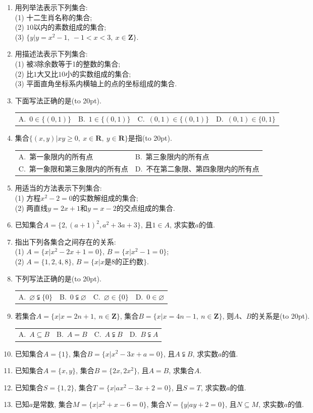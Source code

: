 \documentclass[10pt,a4paper]{article}
\newcommand{\bracket}[1]{(\hbox to #1pt{})}
\newcommand{\twoch}[4]{\par\begin{tabular}{p{.46\textwidth}p{.46\textwidth}}
A.~#1& B.~#2\\
C.~#3& D.~#4
\end{tabular}}
\newcommand{\fourch}[4]{\par\begin{tabular}{p{.23\textwidth}p{.23\textwidth}p{.23\textwidth}p{.23\textwidth}}
A.~#1 &B.~#2& C.~#3& D.~#4
\end{tabular}}
\begin{document}
\begin{enumerate}[1.]

\item 用列举法表示下列集合:\\
(1) 十二生肖名称的集合;\\
(2) $10$以内的素数组成的集合;\\
(3) $\{y|y=x^2-1, \ -1<x<3, \ x\in \mathbf{Z}\}$.
\item 用描述法表示下列集合:\\
(1) 被$3$除余数等于1的整数的集合;\\
(2) 比$1$大又比$10$小的实数组成的集合;\\
(3) 平面直角坐标系内横轴上的点的坐标组成的集合.
\item 下面写法正确的是\bracket{20}.
\fourch{$0\in \{(0,1)\}$}{$1\in \{(0,1)\}$}{$(0,1)\in \{(0,1)\}$}{$(0,1)\in \{0,1\}$}
\item 集合$\{(x,y)|xy\ge 0, \ x\in \mathbf{R}, \ y\in \mathbf{R}\}$是指\bracket{20}.
\twoch{第一象限内的所有点}{第三象限内的所有点}{第一象限和第三象限内的所有点}{不在第二象限、第四象限内的所有点}
\item 用适当的方法表示下列集合:\\
(1) 方程$x^2-2=0$的实数解组成的集合;\\
(2) 两直线$y=2x+1$和$y=x-2$的交点组成的集合.
\item 已知集合$A=\{2,(a+1)^2,a^2+3a+3\}$, 且$1\in A$, 求实数$a$的值.
\item 指出下列各集合之间存在的关系:\\
(1) $A=\{x|x^2-2x+1=0\}$, $B=\{x|x^2-1=0\}$;\\
(2) $A=\{1,2,4,8\}$, $B=\{x|x\text{是}8\text{的正约数}\}$.
\item 下列写法正确的是\bracket{20}.
\fourch{$\varnothing \subsetneqq \{0\}$}{$0\subsetneqq \varnothing$}{$\varnothing \in \{0\}$}{$0\in \varnothing$}
\item 若集合$A=\{x|x=2n+1, \ n\in \mathbf{Z}\}$, 集合$B=\{x|x=4n-1, \ n\in \mathbf{Z}\}$, 则$A$、$B$的关系是\bracket{20}.
\fourch{$A\subseteq B$}{$A=B$}{$A\subsetneqq B$}{$B\subsetneqq A$}
\item 已知集合$A=\{1\}$, 集合$B=\{x|x^2-3x+a=0\}$, 且$A\subsetneqq B$, 求实数$a$的值.
\item 已知集合$A=\{x,y\}$, 集合$B=\{2x,2x^2\}$, 且$A=B$, 求集合$A$.
\item 已知集合$S=\{1,2\}$, 集合$T=\{x|ax^2-3x+2=0\}$, 且$S=T$, 求实数$a$的值.
\item 已知$a$是常数, 集合$M=\{x|x^2+x-6=0\}$, 集合$N=\{y|ay+2=0\}$, 且$N\subseteq M$, 求实数$a$的值.

\end{enumerate}
\end{document}
